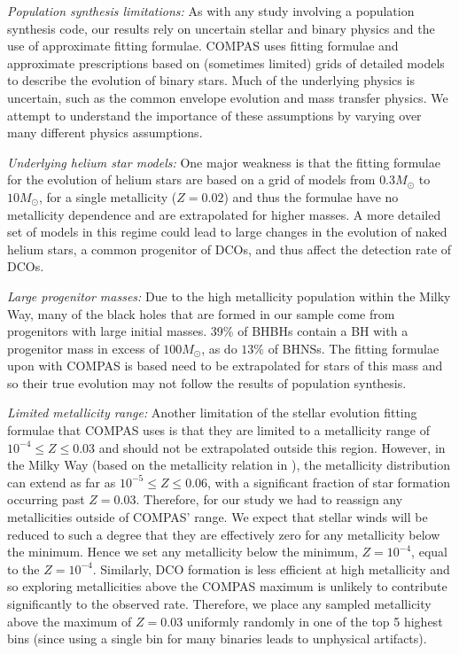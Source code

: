 \textit{Population synthesis limitations:} As with any study involving a population synthesis code, our results rely on uncertain stellar and binary physics and the use of approximate fitting formulae. COMPAS uses fitting formulae and approximate prescriptions based on (sometimes limited) grids of detailed models to describe the evolution of binary stars. Much of the underlying physics is uncertain, such as the common envelope evolution and mass transfer physics. We attempt to understand the importance of these assumptions by varying over many different physics assumptions.

\textit{Underlying helium star models:} One major weakness is that the \citet{Hurley+2000} fitting formulae for the evolution of helium stars are based on a grid of models from $0.3 \unit{M_{\odot}}$ to $10 \unit{M_{\odot}}$, for a single metallicity ($Z= 0.02$) and thus the formulae have no metallicity dependence and are extrapolated for higher masses. A more detailed set of models in this regime could lead to large changes in the evolution of naked helium stars, a common progenitor of DCOs, and thus affect the detection rate of DCOs.

\textit{Large progenitor masses:} Due to the high metallicity population within the Milky Way, many of the black holes that are formed in our sample come from progenitors with large initial masses. 39\% of BHBHs contain a BH with a progenitor mass in excess of $100 \unit{M_\odot}$, as do $13\%$ of BHNSs. The fitting formulae upon with COMPAS is based need to be extrapolated for stars of this mass and so their true evolution may not follow the results of population synthesis.

\textit{Limited metallicity range:} Another limitation of the stellar evolution fitting formulae that COMPAS uses is that they are limited to a metallicity range of $10^{-4} \le Z \le 0.03$ and should not be extrapolated outside this region. However, in the Milky Way (based on the metallicity relation in \citet{Frankel+2018}), the metallicity distribution can extend as far as $10^{-5} \le Z \le 0.06$, with a significant fraction of star formation occurring past $Z = 0.03$. Therefore, for our study we had to reassign any metallicities outside of COMPAS' range. We expect that stellar winds will be reduced to such a degree that they are effectively zero for any metallicity below the minimum. Hence we set any metallicity below the minimum, $Z = 10^{-4}$, equal to the $Z = 10^{-4}$. Similarly, DCO formation is less efficient at high metallicity \citep[e.g.][]{Broekgaarden+2021} and so exploring metallicities above the COMPAS maximum is unlikely to contribute significantly to the observed rate. Therefore, we place any sampled metallicity above the maximum of $Z = 0.03$ uniformly randomly in one of the top 5 highest bins (since using a single bin for many binaries leads to unphysical artifacts).

